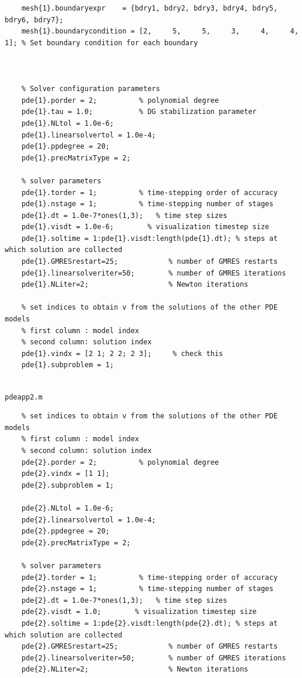 \documentclass[12pt, a4paper]{report}
\begin{document}
\begin{lstlisting}
    mesh{1}.boundaryexpr    = {bdry1, bdry2, bdry3, bdry4, bdry5, bdry6, bdry7};
    mesh{1}.boundarycondition = [2,     5,     5,     3,     4,     4,    1]; % Set boundary condition for each boundary



    % Solver configuration parameters
    pde{1}.porder = 2;          % polynomial degree
    pde{1}.tau = 1.0;           % DG stabilization parameter
    pde{1}.NLtol = 1.0e-6;
    pde{1}.linearsolvertol = 1.0e-4;
    pde{1}.ppdegree = 20;
    pde{1}.precMatrixType = 2;
    
    % solver parameters
    pde{1}.torder = 1;          % time-stepping order of accuracy
    pde{1}.nstage = 1;          % time-stepping number of stages
    pde{1}.dt = 1.0e-7*ones(1,3);   % time step sizes
    pde{1}.visdt = 1.0e-6;        % visualization timestep size
    pde{1}.soltime = 1:pde{1}.visdt:length(pde{1}.dt); % steps at which solution are collected
    pde{1}.GMRESrestart=25;            % number of GMRES restarts
    pde{1}.linearsolveriter=50;        % number of GMRES iterations
    pde{1}.NLiter=2;                   % Newton iterations
    
    % set indices to obtain v from the solutions of the other PDE models 
    % first column : model index
    % second column: solution index
    pde{1}.vindx = [2 1; 2 2; 2 3];     % check this
    pde{1}.subproblem = 1;
    
\end{lstlisting}

\clearpage
\large \texttt{pdeapp2.m}
\begin{lstlisting}
    % set indices to obtain v from the solutions of the other PDE models 
    % first column : model index
    % second column: solution index
    pde{2}.porder = 2;          % polynomial degree
    pde{2}.vindx = [1 1];
    pde{2}.subproblem = 1;

    pde{2}.NLtol = 1.0e-6;
    pde{2}.linearsolvertol = 1.0e-4;
    pde{2}.ppdegree = 20;
    pde{2}.precMatrixType = 2;

    % solver parameters
    pde{2}.torder = 1;          % time-stepping order of accuracy
    pde{2}.nstage = 1;          % time-stepping number of stages
    pde{2}.dt = 1.0e-7*ones(1,3);   % time step sizes
    pde{2}.visdt = 1.0;        % visualization timestep size
    pde{2}.soltime = 1:pde{2}.visdt:length(pde{2}.dt); % steps at which solution are collected
    pde{2}.GMRESrestart=25;            % number of GMRES restarts
    pde{2}.linearsolveriter=50;        % number of GMRES iterations
    pde{2}.NLiter=2;                   % Newton iterations
\end{lstlisting}
\end{document}
